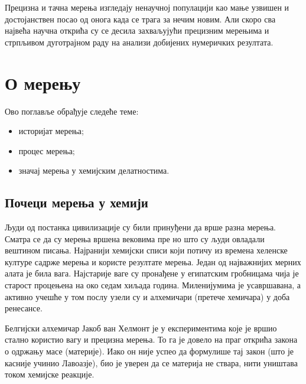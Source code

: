 \begin{savequote}
	Прецизна и тачна мерења изгледају ненаучној популацији
	као мање узвишен и достојанствен посао од онога када
	се трага за нечим новим. Али скоро сва највећа научна
	открића су се десила захваљујући прецизним мерењима и
	стрпљивом дуготрајном раду на анализи добијених нумеричких
	резултата.
\end{savequote}
\chapter{О мерењу}

\begin{sazetak}
  Ово поглавље обрађује следеће теме:\\[2mm]
  \begin{itemize}
  \item историјат мерења;
  \item процес мерења;
  \item значај мерења у хемијским делатностима.
  \end{itemize}
\end{sazetak}

\section{Почеци мерења у хемији}

Људи од постанка цивилизације су били принуђени да врше разна мерења.
Сматра се да су мерења вршена вековима пре но што су људи овладали
вештином писања. Најранији хемијски списи који потичу из времена
хеленске културе садрже мерења и користе резултате мерења. Један
од најважнијих мерних алата је била вага. Најстарије ваге су
пронађене у египатским гробницама чија је старост процењена на
око седам хиљада година. Миленијумима је усавршавана, а активно
учешће у том послу узели су и алхемичари (претече хемичара) у доба
ренесансе.

Белгијски алхемичар Јакоб ван Хелмонт је у експериментима које је
вршио стално користио вагу и прецизна мерења. То га је довело на
праг открића закона о одржању масе (материје). Иако он није успео
да формулише тај закон (што је касније учинио Лавоазје), био је
уверен да се материја не ствара, нити уништава током хемијске
реакције.

